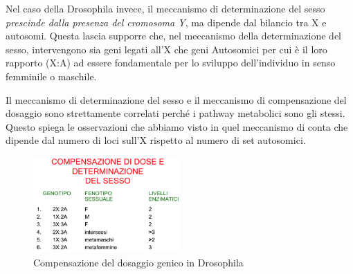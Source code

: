 \documentclass[11pt]{book}
\begin{document}
Nel caso della Drosophila invece, il meccanismo di determinazione del sesso \emph{prescinde dalla presenza del cromosoma Y}, ma dipende dal bilancio tra X e autosomi. Questa lascia supporre che, nel meccanismo della determinazione del sesso, intervengono sia geni legati all’X che geni Autosomici per cui è il loro rapporto (X:A) ad essere fondamentale per lo sviluppo dell’individuo in senso femminile o maschile.

Il meccanismo di determinazione del sesso e il meccanismo di compensazione del dosaggio sono strettamente correlati perché i pathway metabolici sono gli stessi. Questo spiega le osservazioni che abbiamo visto in quel meccanismo di conta che dipende dal numero di loci sull’X rispetto al numero di set autosomici.

\clearpage

\begin{figure}
    \includegraphics[width=0.5\textwidth]{img/compensazione_determinazione.png}
  \caption{Compensazione del dosaggio genico in Drosophila}
\end{figure}
\end{document}
